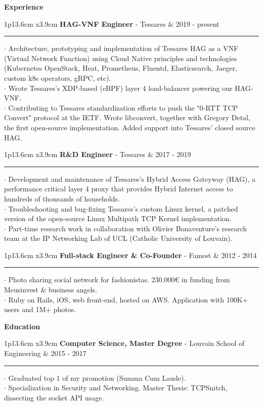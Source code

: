 \documentclass[10pt,A4]{article}
\newcommand{\cvsection}[1]
{
	\begin{center}
		\large\textcolor{sectcol}{\textbf{#1}}
	\end{center}
}
\newcommand{\cvevent}[5]
{

\begin{tabular*}{1\textwidth}{p{13.6cm}  x{3.9cm}}
	\textbf{#2} - \textcolor{bgcol}{#3} &   \vspace{2.5pt}\textcolor{sectcol}{#1}
\end{tabular*}

\vspace{-8pt}
\textcolor{softcol}{\hrule}
\vspace{6pt}

  $\cdot$ #4\\[3pt]
  $\cdot$ #5\\[6pt]

}
\newcommand{\cveventthree}[6]
{

\begin{tabular*}{1\textwidth}{p{13.6cm}  x{3.9cm}}
	\textbf{#2} - \textcolor{bgcol}{#3} &   \vspace{2.5pt}\textcolor{sectcol}{#1}
\end{tabular*}

\vspace{-8pt}
\textcolor{softcol}{\hrule}
\vspace{6pt}

  $\cdot$ #4\\[3pt]
  $\cdot$ #5\\[3pt]
  $\cdot$ #6\\[6pt]

}
\begin{document}
%
%

\cvsection{Experience}

\cveventthree{2019 - present}{HAG-VNF Engineer}{Tessares}
{Architecture, prototyping and implementation of Tessares HAG as a VNF (Virtual Network Function) using Cloud Native principles and technologies (Kubernetes OpenStack, Heat, Prometheus, Fluentd, Elasticsearch, Jaeger, custom k8s operators, gRPC, etc).}
{Wrote Tessares's XDP-based (eBPF) layer 4 load-balancer powering our HAG-VNF.}
{Contributing to Tessares standardization efforts to push the "0-RTT TCP Convert" protocol at the IETF. Wrote libconvert, together with Gregory Detal, the first open-source implementation. Added support into Tessares' closed source HAG.}

\cveventthree{2017 - 2019}{R\&D Engineer}{Tessares}
{Development and maintenance of Tessares's Hybrid Access Gateyway (HAG), a performance critical layer 4 proxy that provides Hybrid Internet access to hundreds of thousands of households.}
{Troubleshooting and bug-fixing Tessares's custom Linux kernel, a patched version of the open-source Linux Multipath TCP Kernel implementation.}
{Part-time research work in collaboration with Olivier Bonaventure's research team at the IP Networking Lab of UCL (Catholic University of Louvain).}

\cvevent{2012 - 2014}{Full-stack Engineer \& Co-Founder}{Famest}
{Photo sharing social network for fashionistas. 230.000€ in funding from Meusinvest \& business angels.}
{Ruby on Rails, iOS, web front-end, hosted on AWS. Application with 100K+ users and 1M+ photos.}


%
\cvsection{Education}

\cvevent{2015 - 2017}
{Computer Science, Master Degree}
{Louvain School of Engineering}
{Graduated top 1 of my promotion (Summa Cum Laude).}
{Specialization in Security and Networking. Master Thesis: TCPSnitch, dissecting the socket API usage.}
\end{document}
